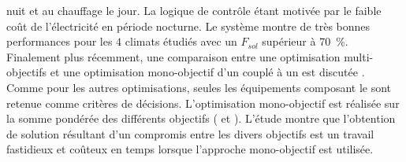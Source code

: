nuit et au chauffage le jour. La logique de contrôle étant motivée par le faible coût de
l’électricité en période nocturne. Le système montre de très bonnes performances pour les
$4$ climats étudiés avec un $F_{sol}$ supérieur à \SI{70}{\percent}. Finalement
plus récemment, une comparaison entre une optimisation multi-objectifs et une optimisation
mono-objectif d’un  couplé à un  est discutée
\parencite{Rey2016622}. Comme pour les autres optimisations, seules les équipements
composant le  sont retenue comme critères de décisions. L’optimisation
mono-objectif est réalisée sur la somme pondérée des différents objectifs (
et ). L’étude montre que l’obtention de solution résultant d’un compromis entre
les divers objectifs est un travail fastidieux et coûteux en temps lorsque l’approche
mono-objectif est utilisée.


